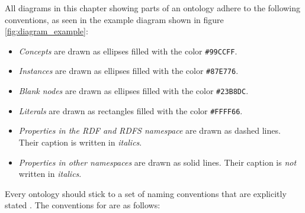 All diagrams in this chapter showing parts of an ontology adhere to the following conventions, as seen in the example diagram shown in figure \ref{fig:diagram_example}:
\begin{itemize}
  \item \emph{Concepts} are drawn as ellipses filled with the color \texttt{\textcolor{convention_color1}{\#99CCFF}}.
  \item \emph{Instances} are drawn as ellipses filled with the color \texttt{\textcolor{convention_color2}{\#87E776}}.
  \item \emph{Blank nodes} are drawn as ellipses filled with the color \texttt{\textcolor{convention_color3}{\#23B8DC}}.
  \item \emph{Literals} are drawn as rectangles filled with the color \texttt{\colorbox{convention_color_bg4}{\textcolor{convention_color4}{\#FFFF66}}}.
  \item \emph{Properties in the RDF\cite{RDF} and RDFS\cite{RDFS} namespace} are drawn as dashed lines. Their caption is written in \emph{italics}.
  \item \emph{Properties in other namespaces} are drawn as solid lines. Their caption is \emph{not} written in \emph{italics}.
\end{itemize}

Every ontology should stick to a set of naming conventions that are explicitly stated \cite{Ontology101}. The conventions for \thinkhomeweather are as follows:


